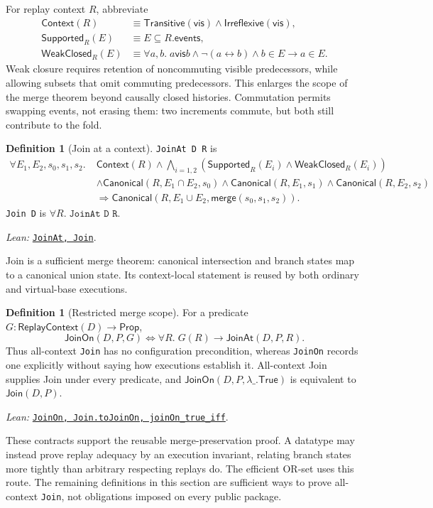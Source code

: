 \documentclass[11pt]{article}
\theoremstyle{definition}
\newtheorem{definition}[theorem]{Definition}
\newcommand{\merge}{\mathsf{merge}}
\newcommand{\vis}{\mathrel{\mathsf{vis}}}
\newcommand{\Can}{\mathsf{Canonical}}
\newcommand{\lean}[1]{\texttt{#1}}
\newcommand{\src}[2]{\href{../../#1}{\texttt{#2}}}
\newcommand{\anchor}[2]{\par\smallskip\noindent\emph{Lean: }\src{#1}{#2}.}
\begin{document}
For replay context $R$, abbreviate
\[
\begin{aligned}
 \mathsf{Context}(R)&\equiv
   \mathsf{Transitive}(\vis)\land\mathsf{Irreflexive}(\vis),\\
 \mathsf{Supported}_R(E)&\equiv E\subseteq R.\mathsf{events},\\
 \mathsf{WeakClosed}_R(E)&\equiv
 \forall a,b.\;a\vis b\land\neg(a\leftrightarrow b)\land b\in E\to a\in E.
\end{aligned}
\]
Weak closure requires retention of noncommuting visible predecessors, while
allowing subsets that omit commuting predecessors. This enlarges the scope of
the merge theorem beyond causally closed histories. Commutation permits
swapping events, not erasing them: two increments commute, but both still
contribute to the fold.

\begin{definition}[Join at a context]
\lean{JoinAt D R} is
\[
\begin{aligned}
 \forall E_1,E_2,s_0,s_1,s_2.\;&
 \mathsf{Context}(R)\land
 \bigwedge_{i=1,2}
   (\mathsf{Supported}_R(E_i)\land\mathsf{WeakClosed}_R(E_i))\\
 &\land\Can(R,E_1\cap E_2,s_0)
 \land\Can(R,E_1,s_1)\land\Can(R,E_2,s_2)\\
 &\Longrightarrow
 \Can(R,E_1\cup E_2,\merge(s_0,s_1,s_2)).
\end{aligned}
\]
\lean{Join D} is $\forall R.\;\lean{JoinAt D R}$.
\anchor{Sal/MRDTs/Framework/MergeLaws.lean}{JoinAt, Join}
\end{definition}

Join is a sufficient merge theorem: canonical intersection and branch
states map to a canonical union state. Its context-local statement is reused
by both ordinary and virtual-base executions.

\begin{definition}[Restricted merge scope]
For a predicate
$G:\mathsf{ReplayContext}(D)\to\mathsf{Prop}$,
\[
 \mathsf{JoinOn}(D,P,G)\Longleftrightarrow
 \forall R.\;G(R)\to\mathsf{JoinAt}(D,P,R).
\]
Thus all-context \lean{Join} has no configuration precondition, whereas
\lean{JoinOn} records one explicitly without saying how executions
establish it. All-context Join supplies Join under every predicate, and
$\mathsf{JoinOn}(D,P,\lambda\_.\mathsf{True})$ is equivalent to
$\mathsf{Join}(D,P)$.
\anchor{Sal/MRDTs/Framework/MergeLaws.lean}{JoinOn, Join.toJoinOn,
  joinOn\_true\_iff}
\end{definition}

These contracts support the reusable merge-preservation proof. A datatype
may instead prove replay adequacy by an execution invariant, relating branch
states more tightly than arbitrary respecting replays do. The efficient
OR-set uses this route. The remaining definitions in this section are
sufficient ways to prove all-context \lean{Join}, not obligations imposed on
every public package.
\end{document}
